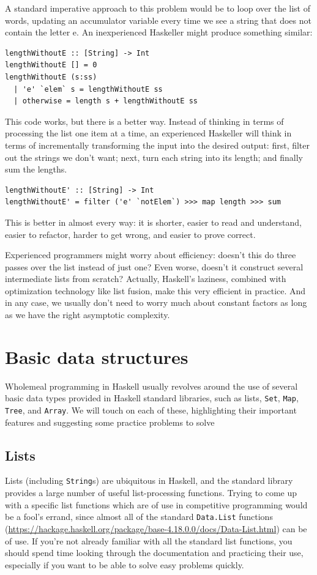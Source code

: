 \documentclass{book}
\newcommand{\h}[1]{\texttt{#1}}
\begin{document}
A standard imperative approach to this problem would be to loop over
the list of words, updating an accumulator variable every time we see
a string that does not contain the letter e.  An inexperienced
Haskeller might produce something similar:
\begin{verbatim}
lengthWithoutE :: [String] -> Int
lengthWithoutE [] = 0
lengthWithoutE (s:ss)
  | 'e' `elem` s = lengthWithoutE ss
  | otherwise = length s + lengthWithoutE ss
\end{verbatim}
This code works, but there is a better way.  Instead of thinking in
terms of processing the list one item at a time, an experienced
Haskeller will think in terms of incrementally transforming the input
into the desired output: first, filter out the strings we don't want;
next, turn each string into its length; and finally sum the lengths.
\begin{verbatim}
lengthWithoutE' :: [String] -> Int
lengthWithoutE' = filter ('e' `notElem`) >>> map length >>> sum
\end{verbatim}
This is better in almost every way: it is shorter, easier to read and
understand, easier to refactor, harder to get wrong, and easier to
prove correct.

Experienced programmers might worry about efficiency: doesn't this do
three passes over the list instead of just one?  Even worse, doesn't
it construct several intermediate lists from scratch?  Actually,
Haskell's laziness, combined with optimization technology like list
fusion, make this very efficient in practice.  And in any case, we
usually don't need to worry much about constant factors as long as we
have the right asymptotic complexity.

\section{Basic data structures}

Wholemeal programming in Haskell usually revolves around the use of
several basic data types provided in Haskell standard libraries, such
as lists, \h{Set}, \h{Map}, \h{Tree}, and \h{Array}.  We will touch on
each of these, highlighting their important features and suggesting
some practice problems to solve

\subsection{Lists}
\label{sec:lists}

Lists (including \h{String}s) are ubiquitous in Haskell, and the
standard library provides a large number of useful list-processing
functions.  Trying to come up with a specific list functions which are
of use in competitive programming would be a fool's errand, since
almost all of the standard \h{Data.List} functions
(\url{https://hackage.haskell.org/package/base-4.18.0.0/docs/Data-List.html})
can be of use.  If you're not already familiar with all the standard
list functions, you should spend time looking through the
documentation and practicing their use, especially if you want to be
able to solve easy problems quickly.
\end{document}

